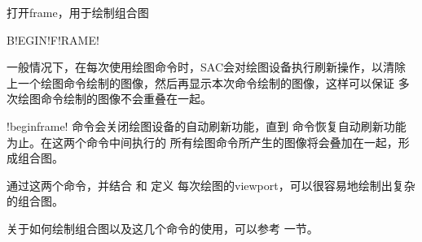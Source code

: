 \label{cmd:beginframe}

打开frame，用于绘制组合图

\begin{SACSTX}
B!EGIN!F!RAME!
\end{SACSTX}

一般情况下，在每次使用绘图命令时，SAC会对绘图设备执行刷新操作，以清除
上一个绘图命令绘制的图像，然后再显示本次命令绘制的图像，这样可以保证
多次绘图命令绘制的图像不会重叠在一起。

!beginframe! 命令会关闭绘图设备的自动刷新功能，直到
 命令恢复自动刷新功能为止。在这两个命令中间执行的
所有绘图命令所产生的图像将会叠加在一起，形成组合图。

通过这两个命令，并结合  和  定义
每次绘图的viewport，可以很容易地绘制出复杂的组合图。

关于如何绘制组合图以及这几个命令的使用，可以参考
 一节。
